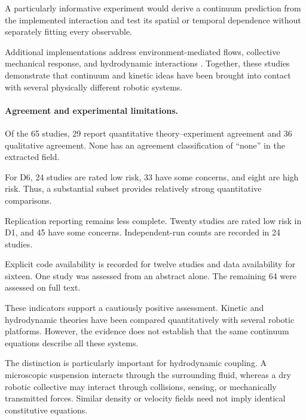 A particularly informative experiment
would derive a continuum prediction
from the implemented interaction
and test its spatial or temporal
dependence without separately
fitting every observable.

Additional implementations address
environment-mediated flows,
collective mechanical response,
and hydrodynamic interactions
\cite{Bo2026threephasesofodd,Newbolt2024flowinteractionsle,Boudet2025effectsofboundarie,Ren2025chlamydomonasinspir,Leech2026spincoupledhydrody,Heuthe2025tunablecolloidalsw,Guo2026afeedbackcontrolle,Luo2025flockingphasesepar,Savoie2019arobotmadeofrobo,Li2020programmingactiveg,Miyashita2008howmorphologyaffec,Fruchart2021nonreciprocalphase}.
Together, these studies demonstrate
that continuum and kinetic ideas
have been brought into contact
with several physically different
robotic systems.

\paragraph*{Agreement and experimental limitations.}

Of the 65 studies, 29 report
quantitative theory--experiment
agreement and 36 qualitative agreement.
None has an agreement classification
of ``none'' in the extracted field.

For D6, 24 studies are rated
low risk, 33 have some concerns,
and eight are high risk.
Thus, a substantial subset
provides relatively strong
quantitative comparisons.

Replication reporting remains
less complete. Twenty studies
are rated low risk in D1,
and 45 have some concerns.
Independent-run counts
are recorded in 24 studies.

Explicit code availability
is recorded for twelve studies
and data availability for sixteen.
One study was assessed from
an abstract alone. The remaining
64 were assessed on full text.

These indicators support
a cautiously positive assessment.
Kinetic and hydrodynamic theories
have been compared quantitatively
with several robotic platforms.
However, the evidence does not
establish that the same continuum
equations describe all these systems.

The distinction is particularly
important for hydrodynamic coupling.
A microscopic suspension interacts
through the surrounding fluid,
whereas a dry robotic collective
may interact through collisions,
sensing, or mechanically transmitted
forces. Similar density or
velocity fields need not imply
identical constitutive equations.

